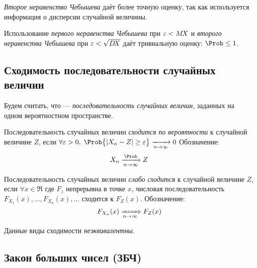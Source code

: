 \begin{rem}
	\emph{Второе неравенство Чебышева} даёт более точную оценку, так как используется информация о дисперсии случайной величины.
\end{rem}

\begin{rem}
	Использование \emph{первого неравенства Чебышева} при $\varepsilon < M\!X$ и \emph{второго неравенства Чебышева} при $\varepsilon < \sqrt{D\!X}$ даёт тривиальную оценку: $\Prob \leq 1$.
\end{rem}


\subsection{Сходимость последовательности случайных величин}

Будем считать, что \infseqX --- \emph{последовательность случайных величин}, заданных на одном вероятностном пространстве.

\begin{defn}
	Последовательность случайных величин \infseqX \emph{сходится по вероятности} к случайной величине $Z$, если $\forall\varepsilon>0,\;\Prob\bigl\{ |X_n - Z| \geq\varepsilon\bigr \}\xrightarrow[n\to\infty]{}0$ Обозначение:
	\[
		X_n\xrightarrow[n\to\infty]{\Prob}Z
	\]
\end{defn}

\begin{defn}
	Последовательность случайных величин \infseqX \emph{слабо сходится} к случайной величине $Z$, если $\forall x\in\Re$ где $F_z$ непрерывна в точке $x$, числовая последовательность $F_{X_1}(x), \dots, F_{X_n}(x), \dots$ сходится к $F_Z(x)$. Обозначение:
	\[
		F_{X_n}(x) \xRightarrow[n\to\infty]{} F_Z(x)
	\]
\end{defn}

\begin{rem}
	Данные виды сходимости \emph{неэквивалентны}.
\end{rem}


\subsection{Закон больших чисел (ЗБЧ)}